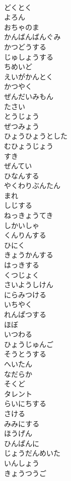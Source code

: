 \documentclass[8pt]{extreport}
\begin{document}
\begin{CJK}{UTF8}{min}
\\	どくとく
\\	よろん
\\	おちゃのま
\\	かんばんばんぐみ
\\	かつどうする
\\	じゅしょうする
\\	ちめいど
\\	えいがかんとく
\\	かつやく
\\	ぜんだいみもん
\\	たさい
\\	とうじょう
\\	ぜつみょう
\\	ひょうひょうとした
\\	むひょうじょう
\\	すき
\\	ぜんてい
\\	ひなんする
\\	やくわりぶんたん
\\	まれ
\\	しじする
\\	ねっきょうてき
\\	しかいしゃ
\\	くんりんする
\\	ひにく
\\	きょうかんする
\\	はっきする
\\	くつじょく
\\	さいようしけん
\\	にらみつける
\\	いちやく
\\	れんぱつする
\\	ほぼ
\\	いつわる
\\	ひょうじゅんご
\\	そうとうする
\\	へいたん
\\	なだらか
\\	そくど
\\	タレント
\\	らいにちする
\\	さける
\\	みみにする
\\	ほうげん
\\	ひんぱんに
\\	じょうだんめいた
\\	いんしょう
\\	きょうつうご

\end{CJK}
\end{document}
